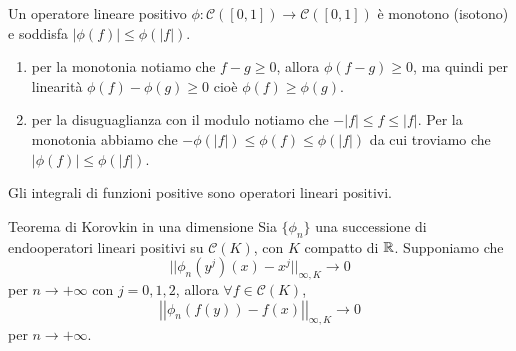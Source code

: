 \documentclass[a4paper]{article}
\begin{document}
\begin{snippetproposition}{}
    Un operatore lineare positivo \(\phi \colon \mathcal C([0,1]) \to \mathcal C([0,1])\)
    è monotono (isotono) e soddisfa \( |\phi(f)|\leq\phi(|f|)\).
\end{snippetproposition}

\begin{snippetproof}{}
    \begin{enumerate}
        \item per la monotonia notiamo che \(f-g \geq 0\), allora
            \(\phi(f-g) \geq 0\), ma quindi per linearità \(\phi(f) - \phi(g) \geq 0\)
            cioè \(\phi(f) \geq \phi(g)\).
        \item per la disuguaglianza con il modulo notiamo che \(-|f| \leq f \leq |f|\).
            Per la monotonia abbiamo che \(-\phi(|f|) \leq \phi(f) \leq \phi(|f|)\)
            da cui troviamo che \(|\phi(f)| \leq \phi(|f|)\).
    \end{enumerate}
\end{snippetproof}

Gli integrali di funzioni positive sono operatori lineari positivi.

\begin{snippettheorem}{Teorema di Korovkin in una dimensione}
    Sia \(\{\phi_n\}\) una successione di endooperatori lineari positivi su
    \(\mathcal C(K)\), con \(K\) compatto di \(\mathbb{R}\).
    Supponiamo che \[
        ||\phi_n(y^j)(x) - x^j||_{\infty, K} \to 0
    \]
    per \(n \to +\infty\) con \(j=0,1,2\), allora
    \(\forall f \in \mathcal C(K)\), \[
        \left|\left|
        \phi_n(f(y)) - f(x)
        \right|\right|_{\infty, K} \to 0
    \]
    per \(n \to +\infty\).
\end{snippettheorem}
\end{document}
